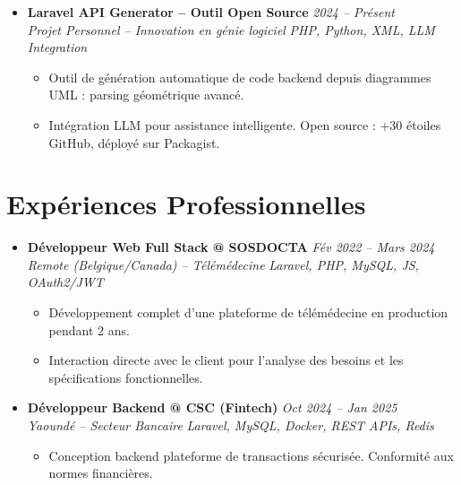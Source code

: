 \documentclass[a4paper,11pt]{article}
\begin{document}
\begin{itemize}[leftmargin=*, label={-}]
\item \textbf{Laravel API Generator -- Outil Open Source} \hfill \textit{2024 -- Présent} \\
\textit{Projet Personnel -- Innovation en génie logiciel} \hfill \textit{PHP, Python, XML, LLM Integration}
\vspace{-2pt}
    \begin{itemize}[leftmargin=0.4cm, nosep, label=\tiny$\bullet$]
        \item \small{Outil de génération automatique de code backend depuis diagrammes UML : parsing géométrique avancé.}
        \item \small{Intégration LLM pour assistance intelligente. Open source : +30 étoiles GitHub, déployé sur Packagist.}
    \end{itemize}
\vspace{3pt}

\end{itemize}

\section{Expériences Professionnelles}
\begin{itemize}[leftmargin=*, label={-}]

\item \textbf{Développeur Web Full Stack @ SOSDOCTA} \hfill \textit{Fév 2022 -- Mars 2024} \\
\textit{Remote (Belgique/Canada) -- Télémédecine} \hfill \textit{Laravel, PHP, MySQL, JS, OAuth2/JWT}
\vspace{-2pt}
    \begin{itemize}[leftmargin=0.4cm, nosep, label=\tiny$\bullet$]
        \item \small{Développement complet d'une plateforme de télémédecine en production pendant 2 ans.}
        \item \small{Interaction directe avec le client pour l'analyse des besoins et les spécifications fonctionnelles.}
    \end{itemize}
\vspace{3pt}

\item \textbf{Développeur Backend @ CSC (Fintech)} \hfill \textit{Oct 2024 -- Jan 2025} \\
\textit{Yaoundé -- Secteur Bancaire} \hfill \textit{Laravel, MySQL, Docker, REST APIs, Redis}
\vspace{-2pt}
    \begin{itemize}[leftmargin=0.4cm, nosep, label=\tiny$\bullet$]
        \item \small{Conception backend plateforme de transactions sécurisée. Conformité aux normes financières.}
    \end{itemize}
\vspace{3pt}

\end{itemize}
\end{document}
